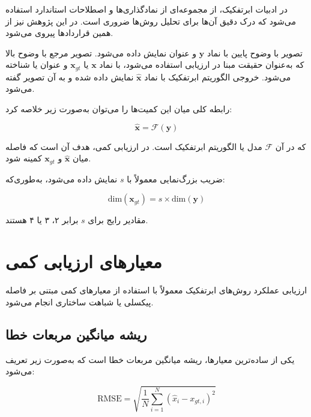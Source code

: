 در ادبیات ابرتفکیک، از مجموعه‌ای از نمادگذاری‌ها و اصطلاحات استاندارد استفاده می‌شود که درک دقیق آن‌ها برای تحلیل روش‌ها ضروری است. در این پژوهش نیز از همین قراردادها پیروی می‌شود.

تصویر با وضوح پایین با نماد $\mathbf{y}$ و عنوان  نمایش داده می‌شود. تصویر مرجع با وضوح بالا که به‌عنوان حقیقت مبنا در ارزیابی استفاده می‌شود، با نماد $\mathbf{x}$ یا $\mathbf{x}_{gt}$ و عنوان  یا  شناخته می‌شود. خروجی الگوریتم ابرتفکیک با نماد $\hat{\mathbf{x}}$ نمایش داده شده و به آن تصویر  گفته می‌شود.

رابطه کلی میان این کمیت‌ها را می‌توان به‌صورت زیر خلاصه کرد:

\begin{equation}
	\hat{\mathbf{x}} = \mathcal{F}(\mathbf{y})
\end{equation}

که در آن $\mathcal{F}$ مدل یا الگوریتم ابرتفکیک است. در ارزیابی کمی، هدف آن است که فاصله میان $\hat{\mathbf{x}}$ و $\mathbf{x}_{gt}$ کمینه شود.

ضریب بزرگ‌نمایی معمولاً با $s$ نمایش داده می‌شود، به‌طوری‌که:

\begin{equation}
	\text{dim}(\mathbf{x}_{gt}) = s \times \text{dim}(\mathbf{y})
\end{equation}

مقادیر رایج برای $s$ برابر ۲، ۳ یا ۴ هستند.

\section{معیارهای ارزیابی کمی}

ارزیابی عملکرد روش‌های ابرتفکیک معمولاً با استفاده از معیارهای کمی مبتنی بر فاصله پیکسلی یا شباهت ساختاری انجام می‌شود.

\subsection{ریشه میانگین مربعات خطا}

یکی از ساده‌ترین معیارها، ریشه میانگین مربعات خطا است که به‌صورت زیر تعریف می‌شود:

\begin{equation}
	\text{RMSE} =
	\sqrt{
		\frac{1}{N}
		\sum_{i=1}^{N}
		\left(
		\hat{x}_i - x_{gt,i}
		\right)^2
	}
\end{equation}

